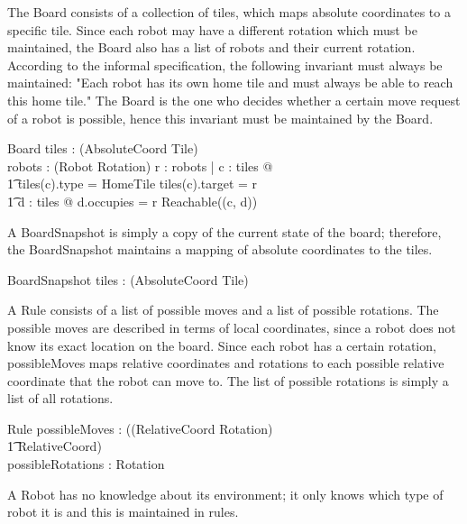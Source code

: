 \documentclass[12pt]{article}
\begin{document}
The Board consists of a collection of tiles, which maps absolute coordinates to a specific tile. Since each robot may have a different rotation which must be maintained, the Board also has a list of robots and their current rotation. \\
According to the informal specification, the following invariant must always be maintained: "Each robot has its own home tile and must always be able to reach this home tile." The Board is the one who decides whether a certain move request of a robot is possible, hence this invariant must be maintained by the Board.

\begin{schema}{Board}
tiles : \power (AbsoluteCoord \fun Tile) \\
robots : \power (Robot \fun Rotation)
\where
\forall r : robots | \exists c : \dom tiles @  \\ \t1 tiles(c).type = HomeTile \wedge tiles(c).target = r \wedge \\ \t1
\exists d : \dom tiles @ d.occupies = r \wedge Reachable((c, d))
\end{schema}

A BoardSnapshot is simply a copy of the current state of the board; therefore, the BoardSnapshot maintains a mapping of absolute coordinates to the tiles.

\begin{schema}{BoardSnapshot}
tiles : \power (AbsoluteCoord \fun Tile) \\
\end{schema}

A Rule consists of a list of possible moves and a list of possible rotations. The possible moves are described in terms of local coordinates, since a robot does not know its exact location on the board. Since each robot has a certain rotation, possibleMoves maps relative coordinates and rotations to each possible relative coordinate that the robot can move to. The list of possible rotations is simply a list of all rotations.

\begin{schema}{Rule}
possibleMoves : \power ((RelativeCoord \times Rotation) \psurj \\ \t1 \seq RelativeCoord) \\
possibleRotations : \power Rotation
\end{schema}

A Robot has no knowledge about its environment; it only knows which type of robot it is and this is maintained in rules.
\end{document}
